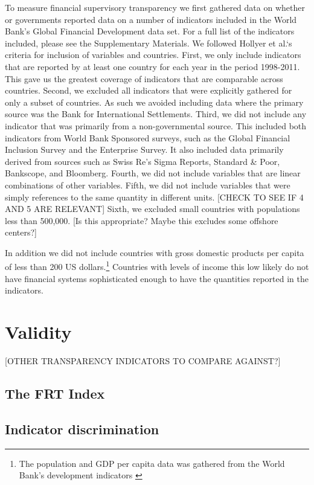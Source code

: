 \documentclass[a4paper]{article}
\begin{document}
To measure financial supervisory transparency we first gathered data on whether or governments reported data on a number of indicators included in the World Bank's Global Financial Development data set. For a full list of the indicators included, please see the Supplementary Materials. We followed Hollyer et al.`s \citeyearpar{Hollyer2014} criteria for inclusion of variables and countries. First, we only include indicators that are reported by at least one country for each year in the period 1998-2011. This gave us the greatest coverage of indicators that are comparable across countries. Second, we excluded all indicators that were explicitly gathered for only a subset of countries. As such we avoided including data where the primary source was the Bank for International Settlements. Third, we did not include any indicator that was primarily from a non-governmental source. This included both indicators from World Bank Sponsored surveys, such as the Global Financial Inclusion Survey and the Enterprise Survey. It also included data primarily derived from sources such as Swiss Re's Sigma Reports, Standard \& Poor, Bankscope, and Bloomberg. Fourth, we did not include variables that are linear combinations of other variables. Fifth, we did not include variables that were simply references to the same quantity in different units. [CHECK TO SEE IF 4 AND 5 ARE RELEVANT] Sixth, we excluded small countries with populations less than 500,000. [Is this appropriate? Maybe this excludes some offshore centers?] 

In addition we did not include countries with gross domestic products per capita of less than 200 US dollars.\footnote{The population and GDP per capita data was gathered from the World Bank's development indicators \citeyearpar{WDIMain}} Countries with levels of income this low likely do not have financial systems sophisticated enough to have the quantities reported in the indicators. 

\section{Validity}

[OTHER TRANSPARENCY INDICATORS TO COMPARE AGAINST?]

\subsection{The FRT Index}

\subsection{Indicator discrimination}
\end{document}
